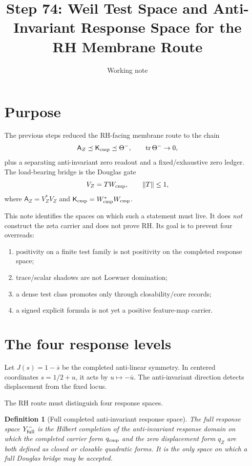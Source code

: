 \documentclass[11pt]{article}
\title{Step 74: Weil Test Space and Anti-Invariant Response Space for the RH Membrane Route}
\author{Working note}
\date{}
\newtheorem{definition}{Definition}
\newcommand{\AZ}{\mathsf A_Z}
\newcommand{\Kcmp}{\mathsf K_{\rm cmp}}
\newcommand{\Yfull}{Y^-_{\rm full}}
\newcommand{\tr}{\operatorname{tr}}
\begin{document}
\maketitle

\section{Purpose}
The previous steps reduced the RH-facing membrane route to the chain
\[
  \AZ \preceq \Kcmp \preceq \Theta^-,
  \qquad \tr \Theta^- \to 0,
\]
plus a separating anti-invariant zero readout and a fixed/exhaustive zero ledger.
The load-bearing bridge is the Douglas gate
\[
  V_Z = T W_{\rm cmp},\qquad \|T\|\le 1,
\]
where \(\AZ=V_Z^*V_Z\) and \(\Kcmp=W_{\rm cmp}^*W_{\rm cmp}\).

This note identifies the spaces on which such a statement must live.  It does \emph{not} construct the zeta carrier and does not prove RH.  Its goal is to prevent four overreads:
\begin{enumerate}[label=(\roman*)]
\item positivity on a finite test family is not positivity on the completed response space;
\item trace/scalar shadows are not Loewner domination;
\item a dense test class promotes only through closability/core records;
\item a signed explicit formula is not yet a positive feature-map carrier.
\end{enumerate}

\section{The four response levels}
Let \(J(s)=1-\overline{s}\) be the completed anti-linear symmetry.  In centered coordinates \(s=1/2+u\), it acts by \(u\mapsto -\overline u\).  The anti-invariant direction detects displacement from the fixed locus.

The RH route must distinguish four response spaces.

\begin{definition}[Full completed anti-invariant response space]
The full response space \(\Yfull\) is the Hilbert completion of the anti-invariant response domain on which the completed carrier form \(q_{\rm cmp}\) and the zero displacement form \(q_Z\) are both defined as closed or closable quadratic forms.  It is the only space on which a full Douglas bridge may be accepted.
\end{definition}
\end{document}
